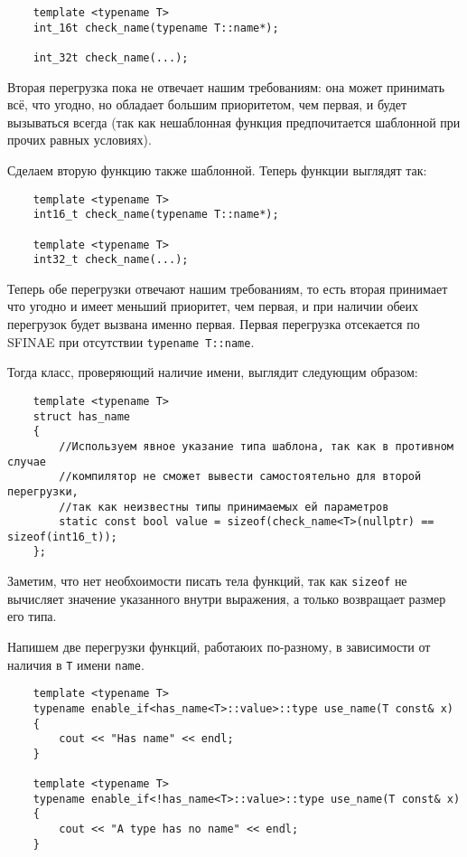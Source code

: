 	\begin{verbatim}
	template <typename T>
	int_16t check_name(typename T::name*);

	int_32t check_name(...);
	\end{verbatim}
	
	Вторая перегрузка пока не отвечает нашим требованиям: она может принимать всё, что угодно, но обладает большим приоритетом, чем первая, и будет вызываться всегда (так как нешаблонная функция предпочитается шаблонной при прочих равных условиях).

	Сделаем вторую функцию также шаблонной. Теперь функции выглядят так:
	
	\begin{verbatim}
	template <typename T>
	int16_t check_name(typename T::name*);
	
	template <typename T>
	int32_t check_name(...);
	\end{verbatim}
	
	Теперь обе перегрузки отвечают нашим требованиям, то есть вторая принимает что угодно и имеет меньший приоритет, чем первая, и при наличии обеих перегрузок будет вызвана именно первая. Первая перегрузка отсекается по SFINAE при отсутствии \texttt{typename T::name}.
	
	Тогда класс, проверяющий наличие имени, выглядит следующим образом:

	\begin{verbatim}
	template <typename T>
	struct has_name
	{
	    //Используем явное указание типа шаблона, так как в противном случае
	    //компилятор не сможет вывести самостоятельно для второй перегрузки,
	    //так как неизвестны типы принимаемых ей параметров
	    static const bool value = sizeof(check_name<T>(nullptr) == sizeof(int16_t));
	};
	\end{verbatim}

	Заметим, что нет необхоимости писать тела функций, так как \texttt{sizeof} не вычисляет значение указанного внутри выражения, а только возвращает размер его типа.
	
	Напишем две перегрузки функций, работаюих по-разному, в зависимости от наличия в \texttt{T} имени \texttt{name}.
	
	\begin{verbatim}
	template <typename T>
	typename enable_if<has_name<T>::value>::type use_name(T const& x)
	{
	    cout << "Has name" << endl;
	}

	template <typename T>
	typename enable_if<!has_name<T>::value>::type use_name(T const& x)
	{
	    cout << "A type has no name" << endl;
	}
	\end{verbatim}
	
